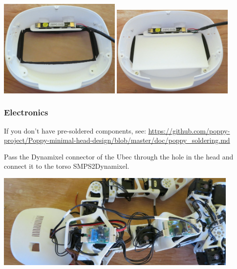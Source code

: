\documentclass{article}
\begin{document}
\begin{center}
  \includegraphics[width=0.45\textwidth]{img/head_screen_cover}
  \includegraphics[width=0.45\textwidth]{img/head_screen}
 \end{center}

\subsubsection{Electronics}

If you don't have pre-soldered components, see: \url{https://github.com/poppy-project/Poppy-minimal-head-design/blob/master/doc/poppy_soldering.md}



Pass the Dynamixel connector of the Ubec through the hole in the head and connect it to the torso SMPS2Dynamixel.

\begin{center}
  \includegraphics[width=0.9\textwidth]{img/power_wiring}
 \end{center}
\end{document}
